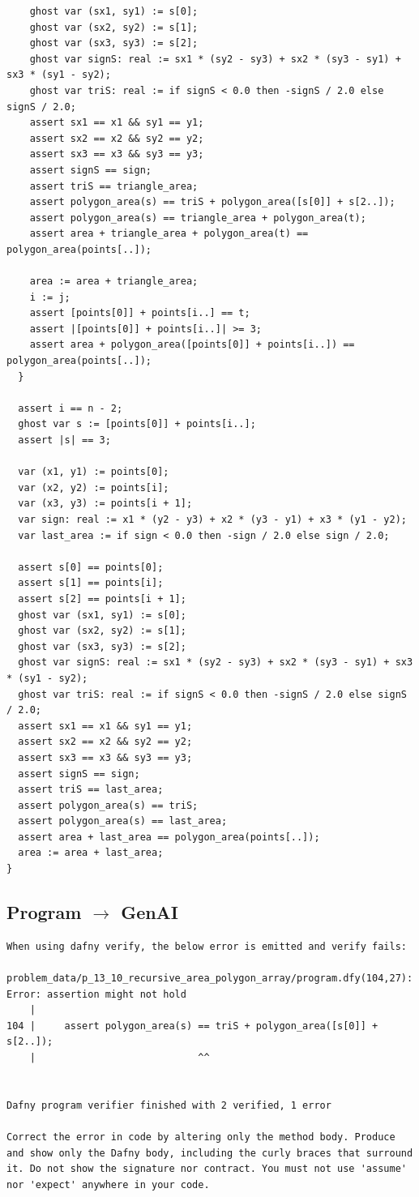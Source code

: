\documentclass{article}
\begin{document}
\begin{lstlisting}
    ghost var (sx1, sy1) := s[0];
    ghost var (sx2, sy2) := s[1];
    ghost var (sx3, sy3) := s[2];
    ghost var signS: real := sx1 * (sy2 - sy3) + sx2 * (sy3 - sy1) + sx3 * (sy1 - sy2);
    ghost var triS: real := if signS < 0.0 then -signS / 2.0 else signS / 2.0;
    assert sx1 == x1 && sy1 == y1;
    assert sx2 == x2 && sy2 == y2;
    assert sx3 == x3 && sy3 == y3;
    assert signS == sign;
    assert triS == triangle_area;
    assert polygon_area(s) == triS + polygon_area([s[0]] + s[2..]);
    assert polygon_area(s) == triangle_area + polygon_area(t);
    assert area + triangle_area + polygon_area(t) == polygon_area(points[..]);

    area := area + triangle_area;
    i := j;
    assert [points[0]] + points[i..] == t;
    assert |[points[0]] + points[i..]| >= 3;
    assert area + polygon_area([points[0]] + points[i..]) == polygon_area(points[..]);
  }

  assert i == n - 2;
  ghost var s := [points[0]] + points[i..];
  assert |s| == 3;

  var (x1, y1) := points[0];
  var (x2, y2) := points[i];
  var (x3, y3) := points[i + 1];
  var sign: real := x1 * (y2 - y3) + x2 * (y3 - y1) + x3 * (y1 - y2);
  var last_area := if sign < 0.0 then -sign / 2.0 else sign / 2.0;

  assert s[0] == points[0];
  assert s[1] == points[i];
  assert s[2] == points[i + 1];
  ghost var (sx1, sy1) := s[0];
  ghost var (sx2, sy2) := s[1];
  ghost var (sx3, sy3) := s[2];
  ghost var signS: real := sx1 * (sy2 - sy3) + sx2 * (sy3 - sy1) + sx3 * (sy1 - sy2);
  ghost var triS: real := if signS < 0.0 then -signS / 2.0 else signS / 2.0;
  assert sx1 == x1 && sy1 == y1;
  assert sx2 == x2 && sy2 == y2;
  assert sx3 == x3 && sy3 == y3;
  assert signS == sign;
  assert triS == last_area;
  assert polygon_area(s) == triS;
  assert polygon_area(s) == last_area;
  assert area + last_area == polygon_area(points[..]);
  area := area + last_area;
}
\end{lstlisting}
\subsection*{Program $\rightarrow$ GenAI}
\begin{lstlisting}
When using dafny verify, the below error is emitted and verify fails:

problem_data/p_13_10_recursive_area_polygon_array/program.dfy(104,27): Error: assertion might not hold
    |
104 |     assert polygon_area(s) == triS + polygon_area([s[0]] + s[2..]);
    |                            ^^


Dafny program verifier finished with 2 verified, 1 error

Correct the error in code by altering only the method body. Produce and show only the Dafny body, including the curly braces that surround it. Do not show the signature nor contract. You must not use 'assume' nor 'expect' anywhere in your code.
\end{lstlisting}
\end{document}
